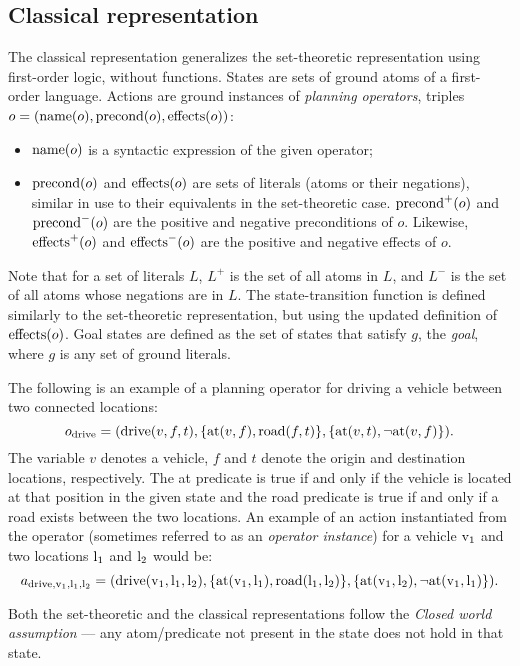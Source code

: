 \subsection{Classical representation}

The classical representation generalizes the set-theoretic representation using first-order logic,
without functions.
States are sets of ground atoms of a first-order language.
Actions are ground instances of \textit{planning operators},
triples $o = (\operatorname{\textrm{name}}(o), \operatorname{\textrm{precond}}(o), \operatorname{\textrm{effects}}(o))$:

\begin{itemize}
\item $\operatorname{\textrm{name}}(o)$ is a syntactic expression of the given operator;
\item $\operatorname{\textrm{precond}}(o)$ and $\operatorname{\textrm{effects}}(o)$ are sets of literals
(atoms or their negations), similar in use to their equivalents
in the set-theoretic case. $\operatorname{\textrm{precond}}^+(o)$ and $\operatorname{\textrm{precond}}^-(o)$
are the positive and negative preconditions of $o$. Likewise,
$\operatorname{\textrm{effects}}^+(o)$ and $\operatorname{\textrm{effects}}^-(o)$ are the positive and negative effects of $o$. 
\end{itemize}
Note that for a set of literals $L$, $L^+$ is the set of all atoms in $L$,
and $L^-$ is the set of all atoms whose negations are in $L$.
The state-transition function is defined similarly to the set-theoretic
representation, but using the updated definition of $\operatorname{\textrm{effects}}(o)$.
Goal states are defined as the set of states that satisfy $g$,
the \textit{goal}, where $g$ is any set of ground literals.

The following is an example of a planning operator for driving a vehicle between two connected locations:
$$o_{\textrm{drive}} = (\textrm{drive}(v, f, t), \{\textrm{at}(v, f), \textrm{road}(f, t)\}, \{\textrm{at}(v, t), \neg \textrm{at}(v, f)\}).$$
The variable $v$ denotes a vehicle, $f$ and $t$ denote the origin and destination locations, respectively. The at predicate is true if and only if the vehicle is located at that position in the given state and the road predicate
is true if and only if a road exists between the two locations.
An example of an action instantiated from the operator (sometimes referred to as an \textit{operator instance})
for a vehicle $\textrm{v}_1$ and two locations $\textrm{l}_1$ and $\textrm{l}_2$ would be:
$$a_{\textrm{drive}, \textrm{v}_1, \textrm{l}_1, \textrm{l}_2} = (\textrm{drive}(\textrm{v}_1, \textrm{l}_1, \textrm{l}_2), \{\textrm{at}(\textrm{v}_1, \textrm{l}_1),
\textrm{road}(\textrm{l}_1, \textrm{l}_2)\}, \{\textrm{at}(\textrm{v}_1, \textrm{l}_2), \neg \textrm{at}(\textrm{v}_1, \textrm{l}_1)\}).$$


Both the set-theoretic and the classical representations follow the \textit{Closed world assumption} --- any atom/predicate not present in the state does not hold in that state.

